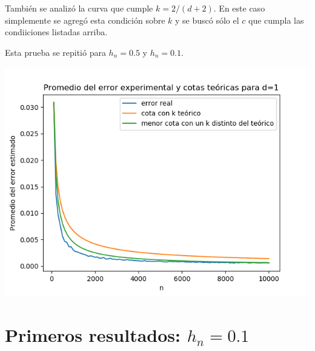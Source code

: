 \documentclass[12pt, a4paper]{article}
\begin{document}
También se analizó la curva que cumple $k=2/(d+2)$. En este caso simplemente se agregó esta condición sobre $k$ y se buscó sólo el $c$ que cumpla las condiiciones listadas arriba.

Esta prueba se repitió para $h_n=0.5$ y $h_n=0.1$.

\includegraphics[width=\textwidth]{figuras_h=0.1/cotas-error-d=1}

\section{Primeros resultados: $h_n=0.1$}
\end{document}
